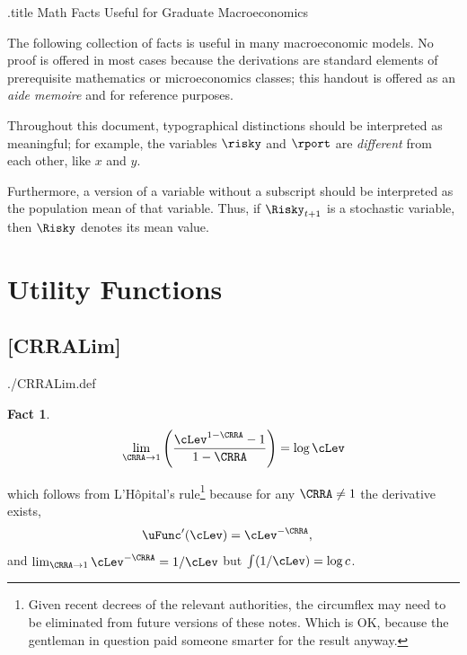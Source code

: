 \documentclass{handout}
\newtheorem{Fact}{Fact}
\begin{document}
\handoutHeader


\begin{verbatimwrite}{\jobname.title}
Math Facts Useful for Graduate Macroeconomics
\end{verbatimwrite}

\handoutNameMake 

The following collection of facts is useful in many macroeconomic
models.  No proof is offered in most cases because the derivations
are standard elements of prerequisite mathematics or microeconomics classes;
this handout is offered as an {\it aide memoire} and for reference purposes.

Throughout this document, typographical distinctions should be interpreted as 
meaningful; for example, the variables $\risky$ and $\rport$ are {\it different} from 
each other, like $x$ and $y$.

Furthermore, a version of a variable without a subscript should be interpreted as 
the population mean of that variable.  Thus, if $\Risky_{t+1}$ is a stochastic
variable, then $\Risky$ denotes its mean value.


\section{{Utility Functions}}


\hypertarget{CRRALim}{}
\subsection{{[CRRALim]}}\label{CRRALim} 

\begin{verbatimwrite}{./CRRALim.def}
\providecommand{\CRRALim}{\href{http://www.econ2.jhu.edu/people/ccarroll/public/LectureNotes/MathFacts/MathFactsList\#CRRALim}{\ensuremath{\mathtt{[CRRALim]}}}}
\end{verbatimwrite}

\begin{Fact} \label{fact:CRRALim} 
\begin{equation}
\lim_{\CRRA \rightarrow 1} \left(\frac{\cLev^{1-\CRRA}-1}{1-\CRRA}\right) = \log \cLev
\end{equation}
\end{Fact}
\noindent which follows from L'H\^{o}pital's rule\footnote{Given recent decrees of the relevant authorities, the circumflex may need to be eliminated from future versions of these notes.  Which is OK, because the gentleman in question paid someone smarter for the result anyway.}  because for any $\CRRA \neq 1$ the derivative exists,
\begin{equation}\begin{gathered}\begin{aligned}
  \uFunc^{\prime}(\cLev) & =  \cLev^{-\CRRA},
\end{aligned}\end{gathered}\end{equation}
and $\lim_{\CRRA \rightarrow 1} \cLev^{-\CRRA} = 1/\cLev$ but $\int (1/\cLev) = \log c$.
\end{document}
